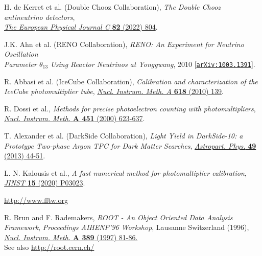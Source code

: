 \documentclass[a4paper,11pt]{article}
\begin{document}

\begin{thebibliography}{99}

H. de Kerret et al. (Double Chooz Collaboration), \emph{The Double Chooz antineutrino detectors},\\ 
\href{https://link.springer.com/article/10.1140/epjc/s10052-022-10726-x}{\emph{The European Physical Journal C} {\bf 82} (2022) 804}.

 J.K. Ahn et al. (RENO Collaboration), \emph{RENO: An Experiment for Neutrino Oscillation \\ Parameter $\theta_{13}$ Using Reactor Neutrinos at Yonggwang}, 2010
[\href{https://arxiv.org/abs/1003.1391}{\texttt{arXiv:1003.1391}}].

 R. Abbasi et al. (IceCube Collaboration), \emph{Calibration and characterization of the IceCube photomultiplier tube}, 
\href{https://www.sciencedirect.com/science/article/abs/pii/S0168900210006662}{ \emph{Nucl. Instrum. Meth. A} {\bf 618} (2010) 139}.

  R. Dossi {et al.}, \emph{Methods for precise photoelectron counting with photomultipliers}, 
\href{https://www.sciencedirect.com/science/article/pii/S0168900200003375}{\emph{Nucl. Instrum. Meth.} {\bf A 451} (2000) 623-637}.

 T. Alexander {et al.} (DarkSide Collaboration), \emph{Light Yield in DarkSide-10: a Prototype Two-phase Argon TPC for Dark Matter Searches}, 
\href{https://www.sciencedirect.com/science/article/pii/S0927650513001254?via\%3Dihub}{\emph{Astropart. Phys.} {\bf 49} (2013) 44-51}.  

 L. N. Kalousis {et al.}, \emph{A fast numerical method for photomultiplier calibration},\\  \href{https://iopscience.iop.org/article/10.1088/1748-0221/15/03/P03023}{\emph{JINST} {\bf 15} (2020) P03023}.

 \href{http://www.fftw.org}{http://www.fftw.org} 

 R. Brun and F. Rademakers, \emph{ROOT - An Object Oriented Data Analysis Framework}, \emph{Proceedings AIHENP'96 Workshop}, Lausanne Switzerland (1996),
\href{https://www.sciencedirect.com/science/article/pii/S016890029700048X?via\%3Dihub}{\emph{Nucl. Instrum. Meth.} {\bf A 389 } (1997) 81-86.} \\
See also \href{http://root.cern.ch/}{http://root.cern.ch/}


\end{thebibliography}
\end{document}
